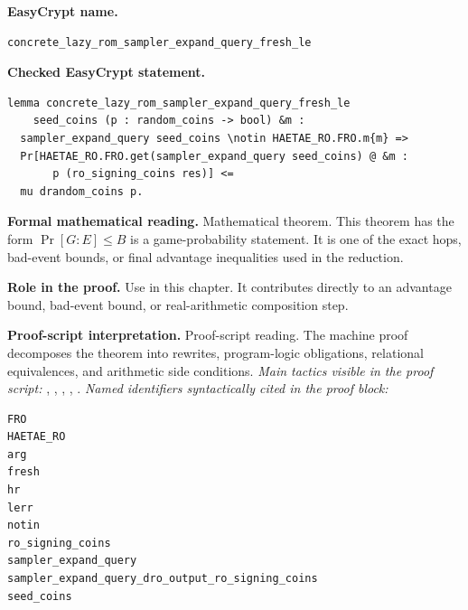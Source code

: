 \begin{formaltheorem}
\noindent\textbf{EasyCrypt name.}
\begin{lstlisting}[language=EasyCrypt,basicstyle=\ttfamily\scriptsize]
concrete_lazy_rom_sampler_expand_query_fresh_le
\end{lstlisting}
\noindent\textbf{Checked EasyCrypt statement.}
\begin{lstlisting}[language=EasyCrypt,basicstyle=\ttfamily\scriptsize]
lemma concrete_lazy_rom_sampler_expand_query_fresh_le
    seed_coins (p : random_coins -> bool) &m :
  sampler_expand_query seed_coins \notin HAETAE_RO.FRO.m{m} =>
  Pr[HAETAE_RO.FRO.get(sampler_expand_query seed_coins) @ &m :
       p (ro_signing_coins res)] <=
  mu drandom_coins p.
\end{lstlisting}
\noindent\textbf{Formal mathematical reading.}
Mathematical theorem. This theorem has the form \(\Pr[G:E] \le B\) is a game-probability statement.  It is one of the exact hops, bad-event bounds, or final advantage inequalities used in the reduction.

\noindent\textbf{Role in the proof.}
Use in this chapter. It contributes directly to an advantage bound, bad-event bound, or real-arithmetic composition step.

\noindent\textbf{Proof-script interpretation.}
Proof-script reading. The machine proof decomposes the theorem into rewrites, program-logic obligations, relational equivalences, and arithmetic side conditions.
\emph{Main tactics visible in the proof script:} , , , , .
\emph{Named identifiers syntactically cited in the proof block:}
\begin{lstlisting}[language=EasyCrypt,basicstyle=\ttfamily\scriptsize]
FRO
HAETAE_RO
arg
fresh
hr
lerr
notin
ro_signing_coins
sampler_expand_query
sampler_expand_query_dro_output_ro_signing_coins
seed_coins
\end{lstlisting}

\end{formaltheorem}

